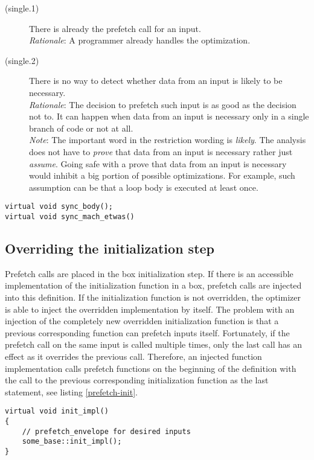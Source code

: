 \begin{description}
\item[(single.1)]{There is already the prefetch call for an input.\\
\emph{Rationale}: A programmer already handles the optimization.
}

\item[(single.2)]{There is no way to detect whether data from an input is likely to be necessary.\\
\emph{Rationale}: The decision to prefetch such input is as good as the decision not to. It can happen when data from an input is necessary only in a single branch of code or not at all.\\
\emph{Note}: The important word in the restriction wording is \emph{likely}. The analysis does not have to \emph{prove} that data from an input is necessary rather just \emph{assume}. Going safe with a prove that data from an input is necessary would inhibit a big portion of possible optimizations. For example, such assumption can be that a loop body is executed at least once.
}
\end{description}

\begin{lstlisting}[caption={Member functions representing the action step.},label={box-body}]
virtual void sync_body();
virtual void sync_mach_etwas()
\end{lstlisting}

\subsection{Overriding the initialization step}
Prefetch calls are placed in the box initialization step. If there is an accessible implementation of the initialization function in a box, prefetch calls are injected into this definition. If the initialization function is not overridden, the optimizer is able to inject the overridden implementation by itself. The problem with an injection of the completely new overridden initialization function is that a previous corresponding function can prefetch inputs itself. Fortunately, if the prefetch call on the same input is called multiple times, only the last call has an effect as it overrides the previous call. Therefore, an injected function implementation calls prefetch functions on the beginning of the definition with the call to the previous corresponding initialization function as the last statement, see listing \ref{prefetch-init}.

\begin{lstlisting}[caption={The generated box initialization function definition.}, label={prefetch-init}]
virtual void init_impl()
{
    // prefetch_envelope for desired inputs
    some_base::init_impl();
}
\end{lstlisting}

